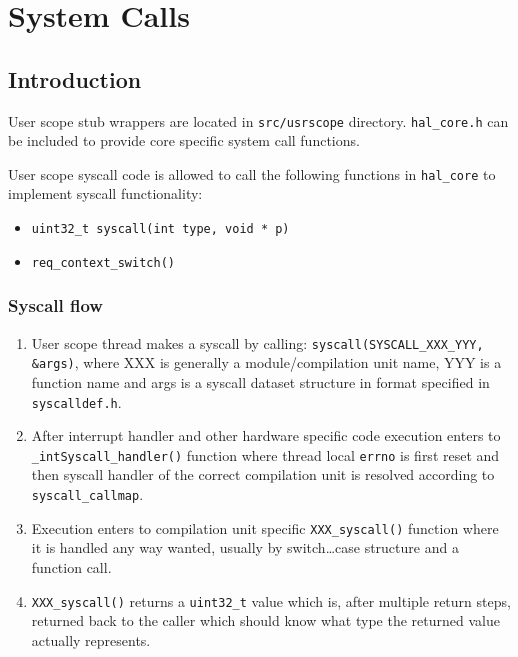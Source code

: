 \part{System Calls}

\chapter{Introduction}
User scope stub wrappers are located in \verb+src/usrscope+ directory.
\verb+hal_core.h+ can be included to provide core specific system call
functions.

User scope syscall code is allowed to call the following functions in
\verb+hal_core+ to implement syscall functionality:

\begin{itemize}
  \item \verb+uint32_t syscall(int type, void * p)+
  \item \verb+req_context_switch()+
\end{itemize}

\section{Syscall flow}

\begin{enumerate}
\item User scope thread makes a syscall by calling:
      \verb+syscall(SYSCALL_XXX_YYY, &args)+, where XXX is generally a
      module/compilation unit name, YYY is a function name and args is a
      syscall dataset structure in format specified in \verb+syscalldef.h+.

\item After interrupt handler and other hardware specific code execution enters
      to \verb+_intSyscall_handler()+ function where thread local \verb+errno+
      is first reset and then syscall handler of the correct compilation unit is
      resolved according to \verb+syscall_callmap+.

\item Execution enters to compilation unit specific \verb+XXX_syscall()+
      function where it is handled any way wanted, usually by switch\ldots case
      structure and a function call.

\item \verb+XXX_syscall()+ returns a \verb+uint32_t+ value which is, after
      multiple return steps, returned back to the caller which should know
      what type the returned value actually represents.
\end{enumerate}


